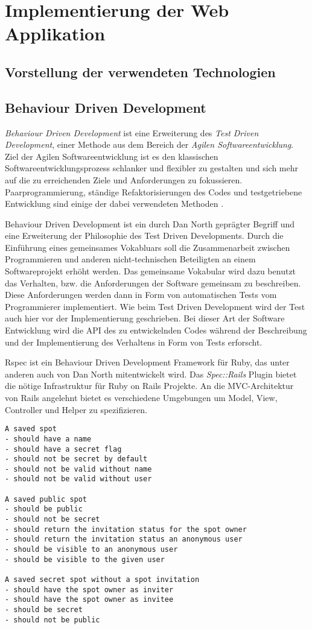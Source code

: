 \chapter{Implementierung der Web Applikation}
\section{Vorstellung der verwendeten Technologien}

\section{Behaviour Driven Development}

\textit{Behaviour Driven Development} ist eine Erweiterung des
\textit{Test Driven Development}, einer Methode aus dem Bereich der
\textit{Agilen Softwareentwicklung}. Ziel der Agilen
Softwareentwicklung ist es den klassischen Softwareentwicklungsprozess
schlanker und flexibler zu gestalten und sich mehr auf die zu
erreichenden Ziele und Anforderungen zu
fokussieren. Paarprogrammierung, ständige Refaktorisierungen des Codes
und testgetriebene Entwicklung sind einige der dabei verwendeten
Methoden \cite{wiki:agile}.

Behaviour Driven Development ist ein durch Dan North geprägter Begriff
und eine Erweiterung der Philosophie des Test Driven
Developments. Durch die Einführung eines gemeinsames Vokabluars soll
die Zusammenarbeit zwischen Programmieren und anderen
nicht-technischen Beteiligten an einem Softwareprojekt erhöht
werden. Das gemeinsame Vokabular wird dazu benutzt das Verhalten,
bzw. die Anforderungen der Software gemeinsam zu beschreiben. Diese
Anforderungen werden dann in Form von automatischen Tests vom
Programmierer implementiert. Wie beim Test Driven Development wird der
Test auch hier vor der Implementierung geschrieben. Bei dieser Art der
Software Entwicklung wird die API des zu entwickelnden Codes während
der Beschreibung und der Implementierung des Verhaltens in Form von
Tests erforscht.

Rspec ist ein Behaviour Driven Development Framework für Ruby, das
unter anderen auch von Dan North mitentwickelt wird. Das
\textit{Spec::Rails} Plugin bietet die nötige Infrastruktur für Ruby
on Rails Projekte. An die MVC-Architektur von Rails angelehnt bietet
es verschiedene Umgebungen um Model, View, Controller und Helper zu
spezifizieren.

\begin{verbatim}
A saved spot
- should have a name
- should have a secret flag
- should not be secret by default
- should not be valid without name
- should not be valid without user

A saved public spot
- should be public
- should not be secret
- should return the invitation status for the spot owner
- should return the invitation status an anonymous user
- should be visible to an anonymous user
- should be visible to the given user

A saved secret spot without a spot invitation
- should have the spot owner as inviter
- should have the spot owner as invitee
- should be secret
- should not be public

\end{verbatim}



